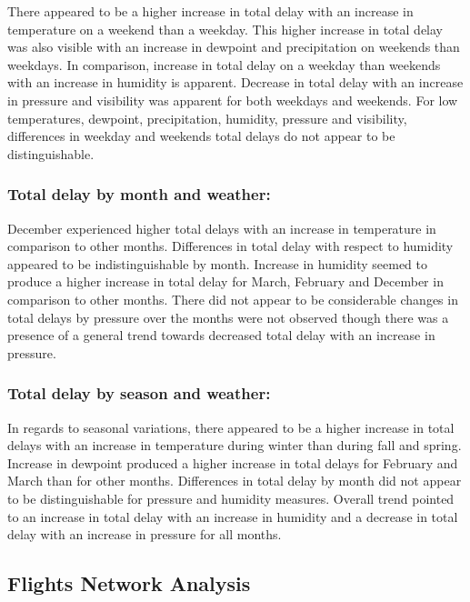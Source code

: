 \documentclass[12pt,twoside]{amherstthesis}
\begin{document}
  There appeared to be a higher increase in total delay with an increase
  in temperature on a weekend than a weekday. This higher increase in
  total delay was also visible with an increase in dewpoint and
  precipitation on weekends than weekdays. In comparison, increase in
  total delay on a weekday than weekends with an increase in humidity is
  apparent. Decrease in total delay with an increase in pressure and
  visibility was apparent for both weekdays and weekends. For low
  temperatures, dewpoint, precipitation, humidity, pressure and
  visibility, differences in weekday and weekends total delays do not
  appear to be distinguishable.
  
  \subsubsection{Total delay by month and
  weather:}\label{total-delay-by-month-and-weather}
  
  December experienced higher total delays with an increase in temperature
  in comparison to other months. Differences in total delay with respect
  to humidity appeared to be indistinguishable by month. Increase in
  humidity seemed to produce a higher increase in total delay for March,
  February and December in comparison to other months. There did not
  appear to be considerable changes in total delays by pressure over the
  months were not observed though there was a presence of a general trend
  towards decreased total delay with an increase in pressure.
  
  \subsubsection{Total delay by season and
  weather:}\label{total-delay-by-season-and-weather}
  
  In regards to seasonal variations, there appeared to be a higher
  increase in total delays with an increase in temperature during winter
  than during fall and spring. Increase in dewpoint produced a higher
  increase in total delays for February and March than for other months.
  Differences in total delay by month did not appear to be distinguishable
  for pressure and humidity measures. Overall trend pointed to an increase
  in total delay with an increase in humidity and a decrease in total
  delay with an increase in pressure for all months.
  
  \clearpage
  
  \subsection{Flights Network Analysis}\label{flights-network-analysis}
  
\end{document}
